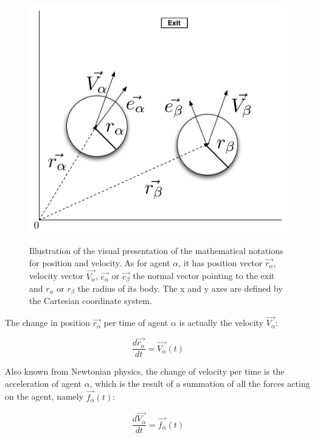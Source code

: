 \begin{figure}[hb]
    \centering
    {\includegraphics[scale=0.35]{Figures/NotationOfAgent.pdf}} 
    \caption[Notation of an agent]{Illustration of the visual presentation of the mathematical notations for position and velocity. As for agent $ \alpha $,
	    it has position vector $ \vec{r_{\alpha}} $, velocity vector $ \vec{V_{\alpha}} $, $\vec{e_{\alpha}}$ or $\vec{e_{\beta}}$ the normal vector pointing
	    to the exit and  $ r_{\alpha} $ or  $ r_{\beta} $ the radius of its body.
	    The x and y axes are defined by the Cartesian coordinate system.}
    \label{NotationOfAgent}
\end{figure}

The change in position $ \vec{r_{\alpha}} $ per time of 
agent $\alpha$ is actually the velocity $ \vec{V_{\alpha}} $:

\begin{equation}
		\frac{d \vec{r_{\alpha}}}{dt} = \vec{V_{\alpha}} \left( t \right)
\end{equation}

Also known from Newtonian physics, the change of velocity per time is the acceleration of agent $\alpha$, which is the result of a summation of all the forces acting on the agent, namely $\vec{f_{\alpha}} \left( t \right)$:

\begin{equation}
    \frac{d \vec{V_{\alpha}}}{dt} = \vec{f_{\alpha}} \left( t \right) 
\end{equation}

